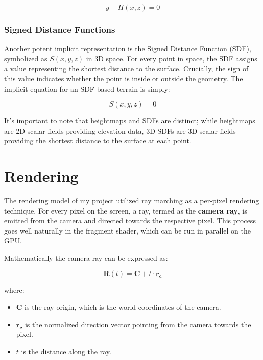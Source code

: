 \begin{equation}
y - H(x,z) = 0
\end{equation}

\subsubsection{Signed Distance Functions}
\label{SDF}

Another potent  implicit representation is the Signed Distance Function (SDF), symbolized as $S(x,y,z)$ in 3D space. For every point in space, the SDF assigns a value representing the shortest distance to the surface. Crucially, the sign of this value indicates whether the point is inside or outside the geometry. The implicit equation for an SDF-based terrain is simply:

\begin{equation}
S(x,y,z) = 0 
\end{equation}

It's important to note that heightmaps and SDFs are distinct; while heightmaps are 2D scalar fields providing elevation data, 3D SDFs are 3D scalar fields providing the shortest distance to the surface at each point. 


\section{Rendering}
\label{Rendering}

The rendering model of my project utilized ray marching as a per-pixel rendering technique. For every pixel on the screen, a ray, termed as the \textbf{camera ray}, is emitted from the camera and directed towards the respective pixel. This process goes well naturally in the fragment shader, which can be run in parallel on the GPU.

Mathematically the camera ray can be expressed as:

\begin{equation}
 \mathbf{R}(t) = \mathbf{C} + t\cdot\mathbf{r_c} 
\end{equation}

where:
\begin{itemize}
    \item $\mathbf{C}$ is the ray origin, which is the world coordinates of the camera.
    \item $\mathbf{r_c}$ is the normalized direction vector pointing from the camera towards the pixel.
    \item $t$ is the distance along the ray.
\end{itemize}

